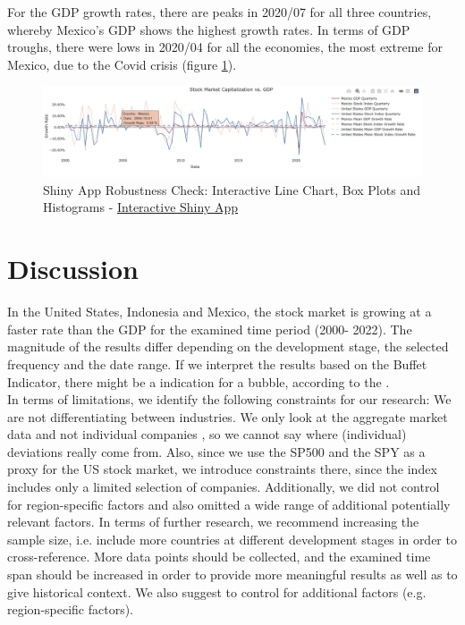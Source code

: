 \documentclass[12pt,a4paper,english]{article}
\begin{document}
For the GDP growth rates, there are peaks in 2020/07 for all three countries, whereby Mexico's GDP shows the highest growth rates. In terms of GDP troughs, there were lows in 2020/04 for all the economies, the most extreme for Mexico, due to the Covid crisis (figure \ref{robustness_linechart}). 



\begin{figure}[H]
    \centering
    \includegraphics[width=15cm]{reports/figures/robustness_linechart.png}
    \caption{Shiny App Robustness Check: Interactive Line Chart, Box Plots and Histograms - \href{https://flurinaschneider.shinyapps.io/DTFF22/}{Interactive Shiny App}}
\label{robustness_linechart}
\end{figure}

\newpage
\section{Discussion}
In the United States, Indonesia and Mexico, the stock market is growing at a faster rate than the GDP for the examined time period (2000- 2022). The magnitude of the results differ depending on the development stage, the selected frequency and the date range. If we interpret the results based on the Buffet Indicator, there might be a indication for a bubble, according to the \cite{buffet}. \\


\indent In terms of limitations, we identify the following constraints for our research: We are not differentiating between industries. We only look at the aggregate market data and not individual companies , so we cannot say where (individual) deviations really come from. Also, since we use the SP500 and the SPY as a proxy for the US stock market, we introduce constraints there, since the index includes only a limited selection of companies. Additionally, we did not control for region-specific factors and also omitted a wide range of additional potentially relevant factors. 
In terms of further research, we recommend increasing the sample size, i.e. include more countries at different development stages in order to cross-reference. More data points should be collected, and the examined time span should be increased in order to provide more meaningful results as well as to give  historical context. We also suggest to control for additional factors (e.g. region-specific factors). 
\end{document}
